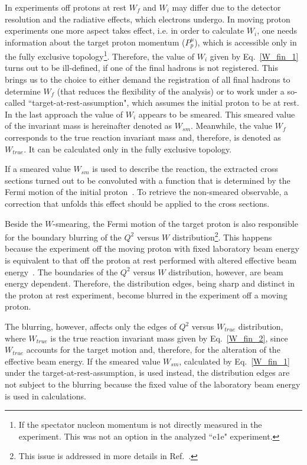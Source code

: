 In experiments off protons at rest $W_{f}$ and $W_{i}$ may differ due to the detector resolution and the radiative effects, which electrons undergo. In moving proton experiments one more aspect takes effect, i.e. in order to calculate $W_{i}$, one needs information about the target proton momentum ($P_{p}^{\mu}$), which is accessible only in the fully exclusive topology\footnote[2]{If the spectator nucleon momentum is not directly measured in the experiment. This was not an option in the analyzed ``e1e" experiment. }. Therefore, the value of  $W_{i}$ given by Eq.~\eqref{W_fin_1} turns out to be ill-defined, if one of the final hadrons is not registered. This brings us to the choice to either demand the registration of all final hadrons to determine $W_{f}$ (that reduces the flexibility of the analysis) or to work under a so-called ``target-at-rest-assumption", which assumes the initial proton to be at rest. In the last approach the value of $W_{i}$ appears to be smeared. This smeared value of the invariant mass is hereinafter denoted as $W_{sm}$. Meanwhile, the value $W_{f}$ corresponds to the true reaction invariant mass and, therefore, is denoted as $W_{true}$. It can be calculated only in the fully exclusive topology.

If a smeared value $W_{sm}$ is used to describe the reaction, the extracted cross sections turned out to be convoluted with a function that is determined by the Fermi motion of the initial proton~\cite{Skorodumina:2015rea,twopeg-d}. To retrieve the non-smeared observable, a correction that unfolds this effect should be applied to the cross sections.


Beside the $W$-smearing, the Fermi motion of the target proton is also responsible for the boundary blurring of the $Q^{2}$ versus $W$ distribution\footnote[3]{This issue is addressed in more details in Ref.~\cite{twopeg-d}.}. This happens because the experiment off the moving proton with fixed laboratory beam energy is equivalent to that off the proton at rest performed with altered effective beam energy~\cite{twopeg-d}. The boundaries of the $Q^{2}$ versus $W$ distribution, however, are beam energy dependent. Therefore, the distribution edges, being sharp and distinct in the proton at rest experiment, become blurred in the experiment off a moving proton.


The blurring, however, affects only the edges of $Q^{2}$ versus $W_{true}$ distribution, where $W_{true}$ is the true reaction invariant mass given by Eq.~\eqref{W_fin_2}, since $W_{true}$ accounts for the target motion and, therefore, for the alteration of the effective beam energy. If the smeared value $W_{sm}$, calculated by Eq.~\eqref{W_fin_1} under the target-at-rest-assumption, is used instead, the distribution edges are not subject to the blurring because the fixed value of the laboratory beam energy is used in calculations.

